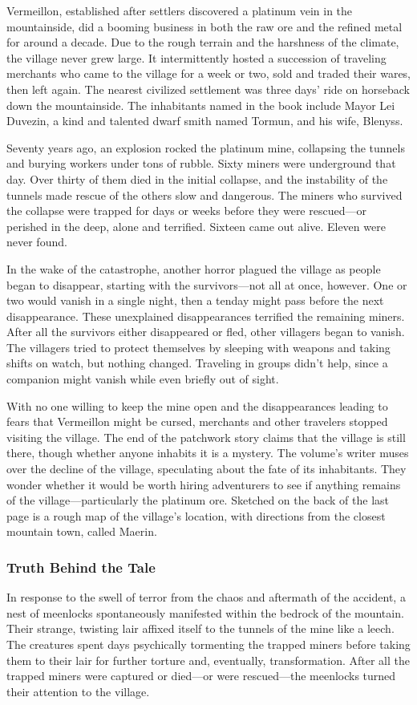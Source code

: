 \documentclass[10pt,a4paper,twoside,bg=print,twocolumn,openany,nodeprecatedcode]{dndbook}
\begin{document}
Vermeillon, established after settlers discovered a platinum vein in the mountainside, did a booming business in both the raw ore and the refined metal for around a decade. Due to the rough terrain and the harshness of the climate, the village never grew large. It intermittently hosted a succession of traveling merchants who came to the village for a week or two, sold and traded their wares, then left again. The nearest civilized settlement was three days' ride on horseback down the mountainside. The inhabitants named in the book include Mayor Lei Duvezin, a kind and talented dwarf smith named Tormun, and his wife, Blenyss.

Seventy years ago, an explosion rocked the platinum mine, collapsing the tunnels and burying workers under tons of rubble. Sixty miners were underground that day. Over thirty of them died in the initial collapse, and the instability of the tunnels made rescue of the others slow and dangerous. The miners who survived the collapse were trapped for days or weeks before they were rescued—or perished in the deep, alone and terrified. Sixteen came out alive. Eleven were never found.

In the wake of the catastrophe, another horror plagued the village as people began to disappear, starting with the survivors—not all at once, however. One or two would vanish in a single night, then a tenday might pass before the next disappearance. These unexplained disappearances terrified the remaining miners. After all the survivors either disappeared or fled, other villagers began to vanish. The villagers tried to protect themselves by sleeping with weapons and taking shifts on watch, but nothing changed. Traveling in groups didn't help, since a companion might vanish while even briefly out of sight.

With no one willing to keep the mine open and the disappearances leading to fears that Vermeillon might be cursed, merchants and other travelers stopped visiting the village. The end of the patchwork story claims that the village is still there, though whether anyone inhabits it is a mystery. The volume's writer muses over the decline of the village, speculating about the fate of its inhabitants. They wonder whether it would be worth hiring adventurers to see if anything remains of the village—particularly the platinum ore. Sketched on the back of the last page is a rough map of the village's location, with directions from the closest mountain town, called Maerin.

\subsubsection{Truth Behind the Tale}
In response to the swell of terror from the chaos and aftermath of the accident, a nest of meenlocks spontaneously manifested within the bedrock of the mountain. Their strange, twisting lair affixed itself to the tunnels of the mine like a leech. The creatures spent days psychically tormenting the trapped miners before taking them to their lair for further torture and, eventually, transformation. After all the trapped miners were captured or died—or were rescued—the meenlocks turned their attention to the village.
\end{document}
